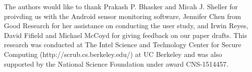 \begin{acks}
The authors would like to thank Prakash P. Bhasker and Micah J. Sheller for proivding us with the Android sensor monitoring software, Jennifer Chen from Good Research for her assistance on conducting the user study, and Irwin Reyes, David Fifield and Michael McCoyd for giving feedback on our paper drafts.
This research was conducted at The Intel Science and Technology Center for Secure Computing (http://scrub.cs.berkeley.edu/) at UC Berkeley and was also supported by the National Science Foundation under award CNS-1514457.
\end{acks}
